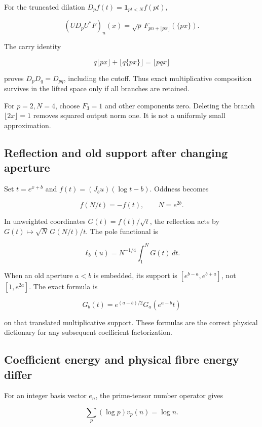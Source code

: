 \documentclass[
  10pt,
  a4paper,
  10pt,
  oneside,
  openany]{book}
\begin{document}
For the truncated dilation \(D_pf(t)=\mathbf1_{pt<N}f(pt)\),

\[
(UD_pU^*F)_n(x)
=\sqrt p\,F_{pn+\lfloor px\rfloor}(\{px\}).
\tag{9.2}\label{eq:9.2}
\]

The carry identity

\[
q\lfloor px\rfloor+\lfloor q\{px\}\rfloor=\lfloor pqx\rfloor
\tag{9.3}\label{eq:9.3}
\]

proves \(D_pD_q=D_{pq}\), including the cutoff. Thus exact
multiplicative composition survives in the lifted space only if all
branches are retained.

For \(p=2,N=4\), choose \(F_3=1\) and other components zero. Deleting
the branch \(\lfloor2x\rfloor=1\) removes squared output norm one. It is
not a uniformly small approximation.

\subsection{Reflection and old support after changing
aperture}\label{reflection-and-old-support-after-changing-aperture}

Set \(t=e^{x+b}\) and \(f(t)=(J_bu)(\log t-b)\). Oddness becomes

\[
f(N/t)=-f(t),\qquad N=e^{2b}.
\tag{9.4}\label{eq:9.4}
\]

In unweighted coordinates \(G(t)=f(t)/\sqrt t\), the reflection acts by
\(G(t)\mapsto\sqrt N\,G(N/t)/t\). The pole functional is

\[
\ell_b(u)=N^{-1/4}\int_1^NG(t)\,dt.
\tag{9.5}\label{eq:9.5}
\]

When an old aperture \(a<b\) is embedded, its support is
\([e^{b-a},e^{b+a}]\), not \([1,e^{2a}]\). The exact formula is

\[
G_b(t)=e^{(a-b)/2}G_a(e^{a-b}t)
\tag{9.6}\label{eq:9.6}
\]

on that translated multiplicative support. These formulas are the
correct physical dictionary for any subsequent coefficient
factorization.

\subsection{Coefficient energy and physical fibre energy
differ}\label{coefficient-energy-and-physical-fibre-energy-differ}

For an integer basis vector \(e_n\), the prime-tensor number operator
gives

\[
\sum_p(\log p)v_p(n)=\log n.
\tag{9.7}\label{eq:9.7}
\]
\end{document}
